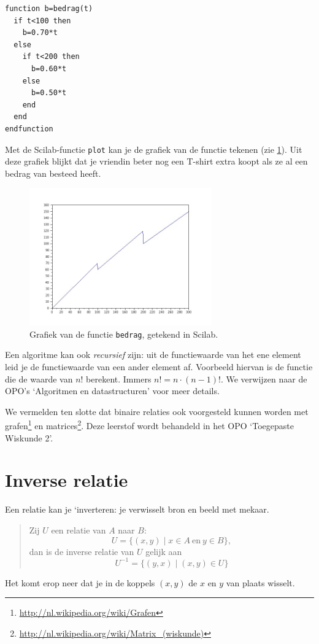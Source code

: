 \begin{verbatim}
function b=bedrag(t)
  if t<100 then
    b=0.70*t
  else 
    if t<200 then
      b=0.60*t
    else
      b=0.50*t
    end
  end
endfunction
\end{verbatim} 

Met de Scilab-functie \verb/plot/ kan je de grafiek van de functie tekenen (zie \cref{fig:solden}).
Uit deze grafiek blijkt dat je vriendin beter nog een T-shirt extra koopt als ze al een bedrag van  besteed heeft.

\begin{figure}[htpb]
\centering
\includegraphics[width=0.7\textwidth]{figuren/verzamelingen_relaties/solden.jpeg}
\caption{Grafiek van de functie \texttt{bedrag}, getekend in Scilab.}
\label{fig:solden}
\end{figure}

Een algoritme kan ook \emph{recursief} zijn: uit de functiewaarde van het ene element leid je de functiewaarde van een ander element af. Voorbeeld hiervan is de functie die de waarde van $n!$ berekent. Immers $n!=n\cdot(n-1)!$. We verwijzen naar de OPO's `Algoritmen en datastructuren' voor meer details.



We vermelden ten slotte dat binaire relaties ook voorgesteld kunnen worden met grafen\footnote{\url{http://nl.wikipedia.org/wiki/Grafen}} en matrices\footnote{\url{http://nl.wikipedia.org/wiki/Matrix_(wiskunde)}}. Deze leerstof wordt behandeld in het OPO `Toegepaste Wiskunde 2'.

\section{Inverse relatie}
\label{sec:invrelatie}
Een relatie kan je `inverteren: je verwisselt bron en beeld met mekaar.
\begin{quote}
Zij $U$ een relatie van $A$ naar $B$: 
\[U=\{({x},{y})\mid {x}\in A \mathrm{~en~}{y}\in B\},\]
dan is de inverse relatie van $U$ gelijk aan 
\[U^{-1}=\{({y},{x})\mid ({x},{y})\in U \}\]
\end{quote}
Het komt erop neer dat je in de koppels $({x},{y})$ de $x$ en $y$ van plaats wisselt.



